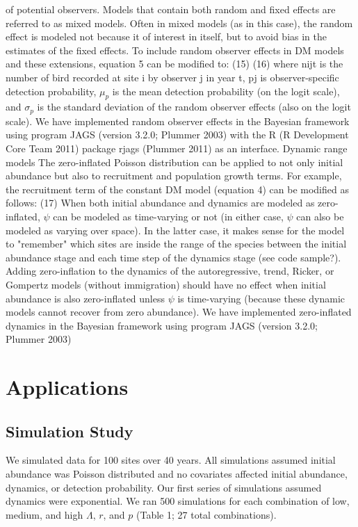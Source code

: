 \documentclass{article}
\begin{document}
of potential observers.  Models that contain both random and
fixed effects are referred to as mixed models.  Often in mixed
models (as in this case), the random effect is modeled not
because it of interest in itself, but to avoid bias in the
estimates of the fixed effects.
To include random observer effects in DM models and these extensions,
equation 5 can be modified to:
(15)
(16)
where nijt is the number of bird recorded at site i by observer j in
year t, pj is observer-specific detection probability, $\mu_p$ is the mean
detection probability (on the logit scale), and $\sigma_p$ is the standard
deviation of the random observer effects (also on the logit scale).
We have implemented random observer effects in the Bayesian framework
using program JAGS (version 3.2.0; Plummer 2003) with the R (R
Development Core Team 2011) package rjags (Plummer 2011) as an
interface.
Dynamic range models
The zero-inflated Poisson distribution can be applied to not only
initial abundance but also to recruitment and population growth terms.
For example, the recruitment term of the constant DM model (equation
4) can be modified as follows:
(17)
When both initial abundance and dynamics are modeled as zero-inflated,
$\psi$ can be modeled as time-varying or not (in either case, $\psi$ can also be
modeled as varying over space).  In the latter case, it makes sense
for the model to "remember" which sites are inside the range of the
species between the initial abundance stage and each time step of the
dynamics stage (see code sample?).  Adding zero-inflation to the
dynamics of the autoregressive, trend, Ricker, or Gompertz models
(without immigration) should have no effect when initial abundance is
also zero-inflated unless $\psi$ is time-varying (because these dynamic
models cannot recover from zero abundance).  We have implemented
zero-inflated dynamics in the Bayesian framework using program JAGS
(version 3.2.0; Plummer 2003)


\section{Applications}

\subsection{Simulation Study}


We simulated data for 100 sites over 40 years.  All
simulations assumed initial abundance was Poisson distributed
and no covariates affected initial abundance, dynamics, or
detection probability.  Our first series of simulations
assumed dynamics were exponential.  We ran 500 simulations for
each combination of low, medium, and high $\Lambda$, $r$, and
$p$ (Table 1; 27 total combinations).
\end{document}

